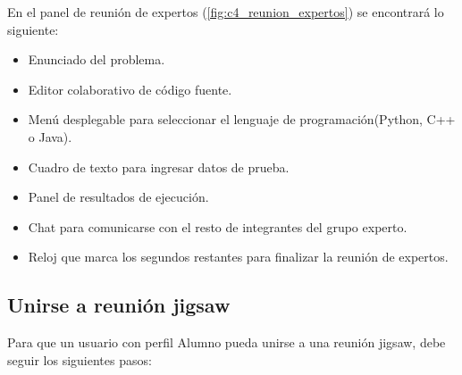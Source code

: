 \begin{enumerate}
	En el panel de reunión de expertos (\autoref{fig:c4_reunion_expertos}) se encontrará lo siguiente: 

	\begin{itemize}
		\item Enunciado del problema.
		\item Editor colaborativo de código fuente.
		\item Menú desplegable para seleccionar el lenguaje de programación(Python, C++ o Java).
		\item Cuadro de texto para ingresar datos de prueba.
		\item Panel de resultados de ejecución.
		\item Chat para comunicarse con el resto de integrantes del grupo experto.
		\item Reloj que marca los segundos restantes para finalizar la reunión de expertos.
	\end{itemize}
\end{enumerate}


\subsection{Unirse a reunión jigsaw}
Para que un usuario con perfil Alumno pueda unirse a una reunión jigsaw, debe seguir los siguientes pasos:

